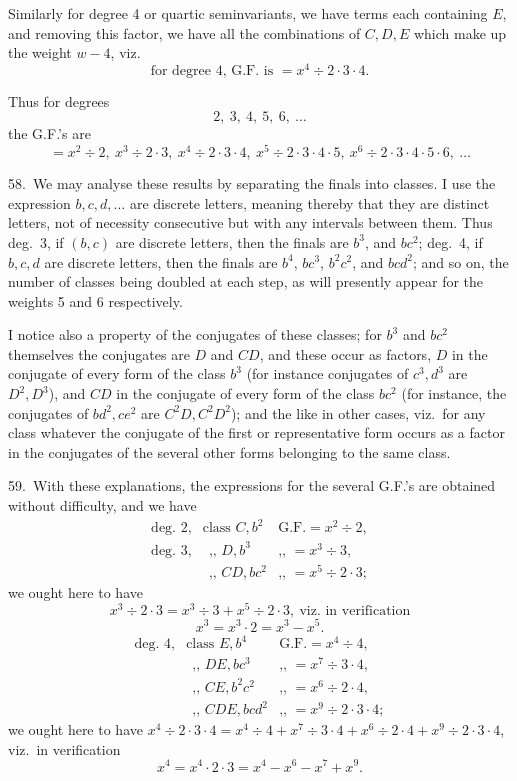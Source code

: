 \documentclass[11pt]{article}
\begin{document}
Similarly for degree 4 or quartic seminvariants, we have terms each containing $E$, and removing this factor, we have all the combinations of $C, D, E$ which make up the weight $w - 4$, viz.
\[
\text{for degree 4, G.F.\ is } = x^4 \div 2 \cdot 3 \cdot 4.
\]

\clearpage
Thus for degrees
\[
2,\ 3,\ 4,\ 5,\ 6,\ \ldots
\]
the G.F.'s are
\[
= x^2 \div 2,\ x^3 \div 2 \cdot 3,\ x^4 \div 2 \cdot 3 \cdot 4,\ x^5 \div 2 \cdot 3 \cdot 4 \cdot 5,\ x^6 \div 2 \cdot 3 \cdot 4 \cdot 5 \cdot 6,\ \ldots
\]

58.\ We may analyse these results by separating the finals into classes. I use the expression $b, c, d, \ldots$ are discrete letters, meaning thereby that they are distinct letters, not of necessity consecutive but with any intervals between them. Thus deg.\ 3, if $(b, c)$ are discrete letters, then the finals are $b^3$, and $bc^2$; deg.\ 4, if $b, c, d$ are discrete letters, then the finals are $b^4$, $bc^3$, $b^2c^2$, and $bcd^2$; and so on, the number of classes being doubled at each step, as will presently appear for the weights 5 and 6 respectively.

I notice also a property of the conjugates of these classes; for $b^3$ and $bc^2$ themselves the conjugates are $D$ and $CD$, and these occur as factors, $D$ in the conjugate of every form of the class $b^3$ (for instance conjugates of $c^3, d^3$ are $D^2, D^3$), and $CD$ in the conjugate of every form of the class $bc^2$ (for instance, the conjugates of $bd^2, ce^2$ are $C^2D, C^2D^2$); and the like in other cases, viz.\ for any class whatever the conjugate of the first or representative form occurs as a factor in the conjugates of the several other forms belonging to the same class.

59.\ With these explanations, the expressions for the several G.F.'s are obtained without difficulty, and we have
\[
\begin{array}{lll}
\text{deg.\ 2,} & \text{class } C, b^2 & \text{G.F.}= x^2 \div 2, \\
\text{deg.\ 3,} & \text{$\ \ $,, } D, b^3 & \text{,, } = x^3 \div 3, \\
                & \text{$\ \ $,, } CD, bc^2 & \text{,, } = x^5 \div 2 \cdot 3;
\end{array}
\]
we ought here to have
\[
x^3 \div 2 \cdot 3 = x^3 \div 3 + x^5 \div 2 \cdot 3,\ \text{viz.\ in verification}
\]
\[
x^3 = x^3 \cdot 2 = x^3 - x^5.
\]
\[
\begin{array}{lll}
\text{deg.\ 4,} & \text{class } E, b^4 & \text{G.F.}= x^4 \div 4, \\
                & \text{$\ \ $,, } DE, bc^3 & \text{,, } = x^7 \div 3 \cdot 4, \\
                & \text{$\ \ $,, } CE, b^2c^2 & \text{,, } = x^6 \div 2 \cdot 4, \\
                & \text{$\ \ $,, } CDE, bcd^2 & \text{,, } = x^9 \div 2 \cdot 3 \cdot 4;
\end{array}
\]
we ought here to have $x^4 \div 2 \cdot 3 \cdot 4 = x^4 \div 4 + x^7 \div 3 \cdot 4 + x^6 \div 2 \cdot 4 + x^9 \div 2 \cdot 3 \cdot 4$, viz.\ in verification
\[
x^4 = x^4 \cdot 2 \cdot 3 = x^4 - x^6 - x^7 + x^9.
\]
\end{document}
